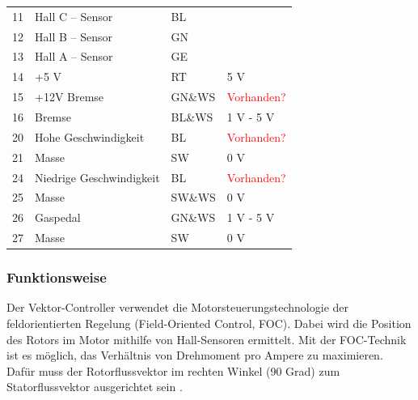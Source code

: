 \begin{table}[!ht]
\begin{tabular}{lll|l}
		\multicolumn{1}{l|}{11}      & Hall C – Sensor          & BL                          &                             \\
		\multicolumn{1}{l|}{12}      & Hall B – Sensor          & GN                          &                             \\
		\multicolumn{1}{l|}{13}      & Hall A – Sensor          & GE                          &                             \\
		\multicolumn{1}{l|}{14}      & +5 V                     & RT                          & 5 V                         \\
		\multicolumn{1}{l|}{15}      & +12V Bremse              & GN\&WS                      & \textcolor{red}{Vorhanden?} \\
		\multicolumn{1}{l|}{16}      & Bremse                   & BL\&WS                      & 1 V - 5 V                   \\
		\multicolumn{1}{l|}{20}      & Hohe Geschwindigkeit     & BL                          & \textcolor{red}{Vorhanden?} \\
		\multicolumn{1}{l|}{21}      & Masse                    & SW                          & 0 V                         \\
		\multicolumn{1}{l|}{24}      & Niedrige Geschwindigkeit & BL                          & \textcolor{red}{Vorhanden?} \\
		\multicolumn{1}{l|}{25}      & Masse                    & SW\&WS                      & 0 V                         \\
		\multicolumn{1}{l|}{26}      & Gaspedal                 & GN\&WS                      & 1 V - 5 V                   \\
		\multicolumn{1}{l|}{27}      & Masse                    & SW                          & 0 V                         \\ \hline
	\end{tabular}
\end{table}
\pagebreak[4]

\subsubsection{Funktionsweise}
\label{Vector_Controller:Funktionsweise}
Der Vektor-Controller verwendet die Motorsteuerungstechnologie der feldorientierten Regelung (Field-Oriented Control, FOC). Dabei wird die Position des Rotors im Motor mithilfe von Hall-Sensoren ermittelt. Mit der FOC-Technik ist es möglich, das Verhältnis von Drehmoment pro Ampere zu maximieren. Dafür muss der Rotorflussvektor im rechten Winkel (90 Grad) zum Statorflussvektor ausgerichtet sein \cite{Golden_Motor:Vector_Controller}.


